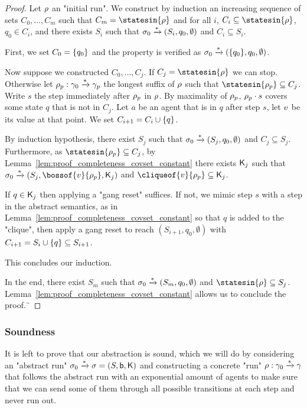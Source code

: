 \begin{proof}
	Let $\rho$ an "initial run".
	We construct by induction an increasing sequence of sets $C_0, \ldots, C_m$ such that $C_m = \statesin{\run}$ and for all $i$, $C_i \subseteq \statesin{\run}$, $q_0 \in C_i$, and there exists $S_i$ such that $\sigma_0 \xrightarrow{*} (S_i, q_0, \emptyset)$ and $C_i \subseteq S_i$. 
	
	First, we set $C_0 = \{q_0\}$ and the property is verified as $\sigma_0 \xrightarrow{*} (\{q_0\}, q_0, \emptyset)$.
	
	Now suppose we constructed $C_0, \ldots, C_j$. If $C_j = \statesin{\run}$ we can stop. Otherwise let $\rho_p: \gamma_0 \xrightarrow{*}\gamma_p$ the longest suffix of $\rho$ such that  $\statesin{\run_p} \subseteq C_j$. Write $s$ the step immediately after $\rho_p$ in $\rho$. By maximality of $\rho_p$, $\rho_p \cdot s$ covers some state $q$ that is not in $C_j$. Let $a$ be an agent that is in $q$ after step $s$, let $v$ be its value at that point. We set $C_{i+1} = C_i \cup \{q\}$.
	
	By induction hypothesis, there exist $S_{j}$ such that $\sigma_0 \xrightarrow{*} (S_{j}, q_0, \emptyset)$ and $C_j \subseteq S_{j}$. Furthermore, as $\statesin{\run_p} \subseteq C_j$, by Lemma~\ref{lem:proof_completeness_covset_constant} there exists $\mathsf{K}_j$ such that $\aconfiginit \step{*} (S_{j}, \bossof{\aval}{\run_p}, \clique_j)$ and $\cliqueof{\aval}{\run_p} \subseteq \clique_j$.
	
	If $q \in \mathsf{K}_j$ then applying a "gang reset" suffices. If not, we mimic step $s$ with a step in the abstract semantics, as in Lemma~\ref{lem:proof_completeness_covset_constant} so that $q$ is added to the "clique", then apply a gang reset to reach $(S_{i+1}, q_0, \emptyset)$ with $C_{i+1} = S_i \cup \{q\} \subseteq S_{i+1}$. 
	
	This concludes our induction.
	
	In the end, there exist $S_m$ such that $\sigma_0 \xrightarrow{*} (S_{m}, q_0, \emptyset)$ and $\statesin{\run} \subseteq S_{j}$. Lemma~\ref{lem:proof_completeness_covset_constant} allows us to conclude the proof.¨
\end{proof}


\subsubsection{Soundness}
\label{sec:one-soundness}

It is left to prove that our abstraction is sound, which we will do by considering an "abstract run" $\sigma_0 \xrightarrow{\ast} \sigma = (S, \mathsf{b}, \mathsf{K})$ and constructing a concrete "run" $\rho : \gamma_0 \xrightarrow{\ast} \gamma $ that follows the abstract run with an exponential amount of agents to make sure that we can send some of them through all possible transitions at each step and never run out.

